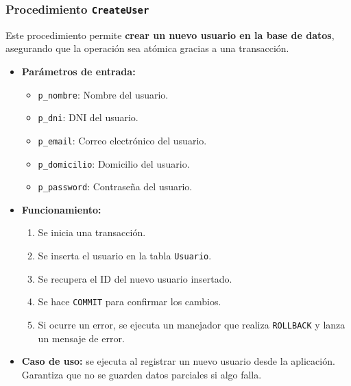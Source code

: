 \documentclass[10pt]{book}
\begin{document}
\subsubsection{Procedimiento \texttt{CreateUser}}

    Este procedimiento permite \textbf{crear un nuevo usuario en la base de datos}, asegurando que la operación sea atómica gracias a una transacción.
    
    \begin{itemize}
        \item \textbf{Parámetros de entrada:}
        \begin{itemize}
            \item \texttt{p\_nombre}: Nombre del usuario.
            \item \texttt{p\_dni}: DNI del usuario.
            \item \texttt{p\_email}: Correo electrónico del usuario.
            \item \texttt{p\_domicilio}: Domicilio del usuario.
            \item \texttt{p\_password}: Contraseña del usuario.
        \end{itemize}
        
        \item \textbf{Funcionamiento:}
        \begin{enumerate}
            \item Se inicia una transacción.
            \item Se inserta el usuario en la tabla \texttt{Usuario}.
            \item Se recupera el ID del nuevo usuario insertado.
            \item Se hace \texttt{COMMIT} para confirmar los cambios.
            \item Si ocurre un error, se ejecuta un manejador que realiza \texttt{ROLLBACK} y lanza un mensaje de error.
        \end{enumerate}
        
        \item \textbf{Caso de uso:} se ejecuta al registrar un nuevo usuario desde la aplicación. Garantiza que no se guarden datos parciales si algo falla.
    \end{itemize}
\end{document}
